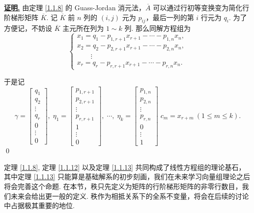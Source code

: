 \documentclass[10pt,openany]{article}
\theoremstyle{thmstyle} %
\theoremstyle{defstyle} %
\theoremstyle{prostyle} %
\renewenvironment{proof}[1][证明]{\par\underline{\textbf{#1.}} \;\fangsong}{\qed\par}
\begin{document}
\begin{proof}
	由定理 \ref{1.1.8} 的 Guass-Jordan 消元法，\( \overline{A} \) 可以通过行初等变换变为简化行阶梯形矩阵 \( \overline{K} \). 记 \( \overline{K} \) 前 \( n \) 列的 \( (i,j) \) 元为 \( p_{ij} \)，最后一列的第 \( i \) 行元为 \( q_i \). 为了方便记，不妨设 \( \overline{K} \) 主元所在列为 \( 1 \sim k \) 列. 那么同解方程组为
	\[ \left\{ \begin{array}{l}
		x_1= q_1-p_{1,r+1}x_{r+1}-\cdots-p_{1,n}x_n, \\
		x_2= q_2-p_{2,r+1}x_{r+1}-\cdots-p_{2,n}x_n, \\
		\qquad \vdots \\
		x_r= q_r-p_{r,r+1}x_{r+1}-\cdots-p_{r,n}x_n. 
	\end{array}\right. \]
	
	于是记
	\[ \gamma=\begin{bmatrix}
		q_1 \\ q_2 \\ \vdots \\ q_r \\ 0  \\ \vdots \\ 0
	\end{bmatrix},\; \eta_1=\begin{bmatrix}
	p_{1,r+1} \\ p_{2,r+1} \\ \vdots \\ p_{r,r+1} \\ 1 \\ \vdots \\ 0
	\end{bmatrix}, \; \cdots, \; \eta_k=\begin{bmatrix}
	p_{1,n} \\ p_{2,n} \\ \vdots \\ p_{r,n} \\ 0 \\ \vdots \\ 1
	\end{bmatrix}  \; c_{m}=x_{r+m} \ ( 1 \leq m \leq k). \]
\end{proof}

定理 \ref{1.1.8}, 定理 \ref{1.1.12} 以及定理 \ref{1.1.13} 共同构成了线性方程组的理论基石，其中定理 \ref{1.1.13} 只能算是基础解系的初步刻画，我们在未来学习向量组理论之后将会完善这个命题. 在本节，秩只先定义为矩阵的行阶梯形矩阵的非零行数目，我们未来会给出更一般的定义. 秩作为相抵关系下的全系不变量，将会在后续的讨论中占据极其重要的地位.
 
\end{document}
